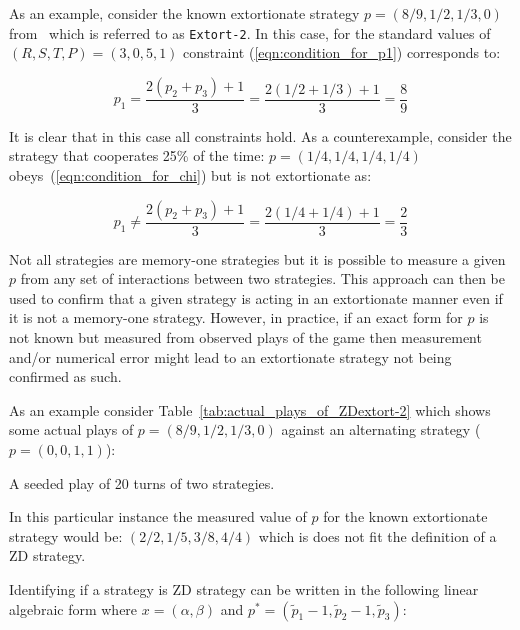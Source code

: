 \documentclass[a4paper]{article}
\begin{document}
As an example, consider the known extortionate strategy \(p=(8 / 9, 1 / 2, 1 /
3, 0)\) from~\cite{Stewart2012} which is referred to as \texttt{Extort-2}. In
this case, for the standard values of \((R, S, T, P) = (3, 0, 5, 1)\)
constraint (\ref{eqn:condition_for_p1}) corresponds to:

\begin{equation}
    p_1 = \frac{2(p_2 + p_3) + 1}{3}
        = \frac{2(1 / 2 + 1 / 3) + 1}{3}
        = \frac{8}{9}
\end{equation}

It is clear that in this case all constraints hold. As a counterexample,
consider the strategy that cooperates 25\% of the time: \(p=(1 /4, 1 / 4, 1 / 4,
1 / 4)\) obeys~(\ref{eqn:condition_for_chi}) but is not extortionate as:

\begin{equation}
    p_1 \ne \frac{2(p_2 + p_3) + 1}{3}
        = \frac{2(1 / 4 + 1 / 4) + 1}{3}
        = \frac{2}{3}
\end{equation}

Not all strategies are memory-one strategies but it is possible to
measure a given \(p\) from any set of interactions between two strategies.
This approach can then be used to confirm that a given strategy is acting
in an extortionate manner even if it is not a memory-one strategy. However, in
practice, if an exact form for \(p\) is not known but measured from observed
plays of the game then measurement and/or numerical error might lead to an
extortionate strategy not being confirmed as such.

As an example consider Table~\ref{tab:actual_plays_of_ZDextort-2} which shows
some actual plays of \(p=(8 / 9, 1 / 2, 1 / 3, 0)\) against an alternating
strategy (\(p=(0, 0, 1, 1)\)):

\begin{table}[!hbtp]
    
    \caption{A seeded play of 20 turns of two strategies.}
    \label{tab:actual_plays_of_ZDextort-2}
\end{table}

In this particular instance the measured value of \(p\) for the known
extortionate strategy would be: \((2/2, 1/5, 3/8, 4/4)\) which is does not fit
the definition of a ZD strategy.

Identifying if a strategy is ZD strategy can be written in the following linear
algebraic form where \(x=(\alpha, \beta)\) and \(p^*=(\tilde p_1 - 1, \tilde p_2
- 1, \tilde p_3)\):
\end{document}
